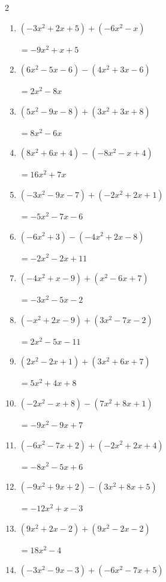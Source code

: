 \begin{multicols}{2}
\begin{enumerate}
  \item $(-3x^{2}+2x+5)+(-6x^{2}-x)$

        $=-9x^{2}+x+5$

  \item $(6x^{2}-5x-6)-(4x^{2}+3x-6)$

        $=2x^{2}-8x$

  \item $(5x^{2}-9x-8)+(3x^{2}+3x+8)$

        $=8x^{2}-6x$

  \item $(8x^{2}+6x+4)-(-8x^{2}-x+4)$

        $=16x^{2}+7x$

  \item $(-3x^{2}-9x-7)+(-2x^{2}+2x+1)$

        $=-5x^{2}-7x-6$

  \item $(-6x^{2}+3)-(-4x^{2}+2x-8)$

        $=-2x^{2}-2x+11$

  \item $(-4x^{2}+x-9)+(x^{2}-6x+7)$

        $=-3x^{2}-5x-2$

  \item $(-x^{2}+2x-9)+(3x^{2}-7x-2)$

        $=2x^{2}-5x-11$

  \item $(2x^{2}-2x+1)+(3x^{2}+6x+7)$

        $=5x^{2}+4x+8$

  \item $(-2x^{2}-x+8)-(7x^{2}+8x+1)$

        $=-9x^{2}-9x+7$

  \item $(-6x^{2}-7x+2)+(-2x^{2}+2x+4)$

        $=-8x^{2}-5x+6$

  \item $(-9x^{2}+9x+2)-(3x^{2}+8x+5)$

        $=-12x^{2}+x-3$

\columnbreak %

\resetques

  \item $(9x^{2}+2x-2)+(9x^{2}-2x-2)$

        $=18x^{2}-4$

  \item $(-3x^{2}-9x-3)+(-6x^{2}-7x+5)$


\end{enumerate}
\end{multicols}
